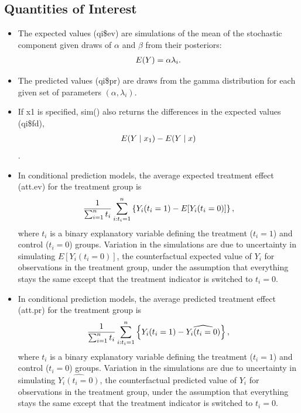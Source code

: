 \documentclass[letterpaper,10pt,english]{sphinxmanual}
\begin{document}
\subsection{Quantities of Interest}
\label{vignette:id4}\begin{itemize}
\item {} 
The expected values (qi\$ev) are simulations of the mean of the
stochastic component given draws of \(\alpha\) and \(\beta\)
from their posteriors:
\begin{gather}
\begin{split}E(Y) = \alpha \lambda_i.\end{split}\notag
\end{gather}
\item {} 
The predicted values (qi\$pr) are draws from the gamma distribution
for each given set of parameters \((\alpha, \lambda_i)\).

\item {} 
If x1 is specified, sim() also returns the differences in the
expected values (qi\$fd),
\begin{gather}
\begin{split}E(Y \mid x_1) -
  E(Y \mid x)\end{split}\notag
\end{gather}
.

\item {} 
In conditional prediction models, the average expected treatment
effect (att.ev) for the treatment group is
\begin{gather}
\begin{split}\frac{1}{\sum_{i=1}^n t_i}\sum_{i:t_i=1}^n \left\{ Y_i(t_i=1) -
      E[Y_i(t_i=0)] \right\},\end{split}\notag
\end{gather}
where \(t_i\) is a binary explanatory variable defining the
treatment (\(t_i=1\)) and control (\(t_i=0\)) groups.
Variation in the simulations are due to uncertainty in simulating
\(E[Y_i(t_i=0)]\), the counterfactual expected value of
\(Y_i\) for observations in the treatment group, under the
assumption that everything stays the same except that the treatment
indicator is switched to \(t_i=0\).

\item {} 
In conditional prediction models, the average predicted treatment
effect (att.pr) for the treatment group is
\begin{gather}
\begin{split}\frac{1}{\sum_{i=1}^n t_i}\sum_{i:t_i=1}^n \left\{ Y_i(t_i=1) -
      \widehat{Y_i(t_i=0)} \right\},\end{split}\notag
\end{gather}
where \(t_i\) is a binary explanatory variable defining the
treatment (\(t_i=1\)) and control (\(t_i=0\)) groups.
Variation in the simulations are due to uncertainty in simulating
\(\widehat{Y_i(t_i=0)}\), the counterfactual predicted value of
\(Y_i\) for observations in the treatment group, under the
assumption that everything stays the same except that the treatment
indicator is switched to \(t_i=0\).

\end{itemize}
\end{document}
